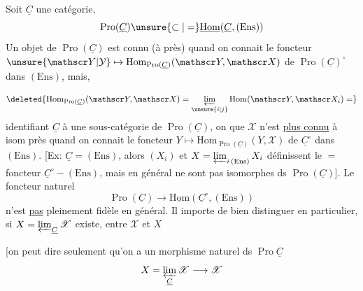 
Soit $\underline C$ une catégorie, 
\[
\operatorname{Pro}(\underline C)\unsure{\subset|=}\underline{\mathrm{Hom}}(\underline C,(\mathrm{Ens}))
\]
Un objet  de $\operatorname{Pro}(\underline C)$ est connu (à  près) quand on connait le foncteur $\unsure{\mathscr Y|\mathcal Y}\mapsto\mathrm{Hom}_{\operatorname{Pro}(\underline C)}(\mathscr Y,\mathscr X)$ de $\operatorname{Pro}(\underline C)^\circ$ dans $(\mathrm{Ens})$,  mais,

\[
\deleted{\mathrm{Hom}_{\operatorname{Pro}(\underline C)}(\mathscr Y,\mathscr X)=\varprojlim_{\unsure{i|j}}\mathrm{Hom}(\mathscr Y,\mathscr X_i)=}
\]
identifiant $\underline C$ à une sous-catégorie de $\operatorname{Pro}(\underline C)$, on  que $\mathscr X$ n'est \uline{plus connu} à isom près quand on connait le foncteur $Y\mapsto\mathrm{Hom}_{\operatorname{Pro}(\underline C)}(Y,\mathscr X)$ de $\underline C^\circ$ dans $(\mathrm{Ens})$. [Ex: $\underline C=(\mathrm{Ens})$, alors $(X_i)$ et $X=\varprojlim_{i\,(\mathrm{Ens})}X_i$ définissent le $=$ foncteur $\underline C^\circ\mathbin{-}(\mathrm{Ens})$, mais en général ne sont pas isomorphes ds $\operatorname{Pro}(\underline C)$]. Le foncteur naturel
\[
\operatorname{Pro}(\underline C)\longrightarrow\underline{\mathrm{Hom}}(\underline C^\circ,(\mathrm{Ens}))
\]
n'est  \uline{pas} pleinement fidèle en général. Il importe de bien distinguer en particulier, si $X=\varprojlim_{\underline C}\mathscr X$ existe, entre $\mathscr X$ et $X$

[on peut dire seulement qu'on a un morphisme naturel ds $\operatorname{Pro}\underline C$
\[
X=\varprojlim_{\underline C}\mathscr X\longrightarrow\mathscr X
\]
